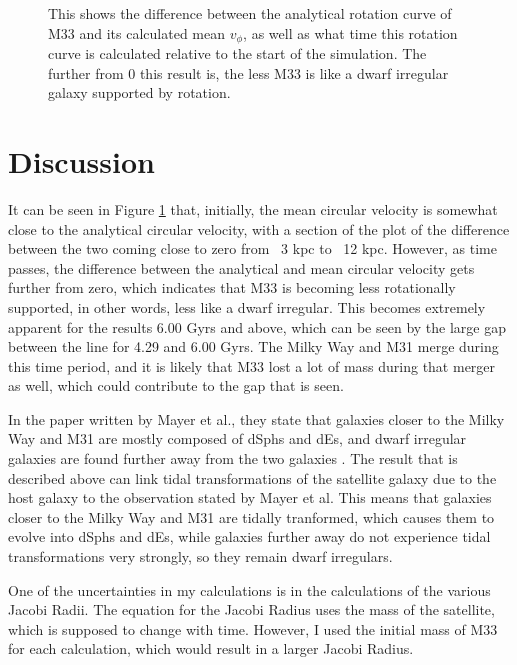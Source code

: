 \documentclass[trackchanges, twocolumn]{aastex7}
\begin{document}
\begin{figure}[ht!]
\caption{ This shows the difference between the analytical rotation curve of M33 and its calculated mean  \(v_\phi\), as well as what time this rotation curve is calculated relative to the start of the simulation. The further from 0 this result is, the less M33 is like a dwarf irregular galaxy supported by rotation.
\label{fig:M33Vphi}}
\end{figure}


\section{Discussion}

It can be seen in Figure \ref{fig:M33Vphi} that, initially, the mean circular velocity is somewhat close to the analytical circular velocity, with a section of the plot of the difference between the two coming close to zero from ~3 kpc to ~12 kpc. However, as time passes, the difference between the analytical and mean circular velocity gets further from zero, which indicates that M33 is becoming less rotationally supported, in other words, less like a dwarf irregular. This becomes extremely apparent for the results 6.00 Gyrs and above, which can be seen by the large gap between the line for 4.29 and 6.00 Gyrs. The Milky Way and M31 merge during this time period, and it is likely that M33 lost a lot of mass during that merger as well, which could contribute to the gap that is seen.

In the paper written by Mayer et al., they state that galaxies closer to the Milky Way and M31 are mostly composed of dSphs and dEs, and dwarf irregular galaxies are found further away from the two galaxies \citep{Mayer2001}. The result that is described above can link tidal transformations of the satellite galaxy due to the host galaxy to the observation stated by Mayer et al. This means that galaxies closer to the Milky Way and M31 are tidally tranformed, which causes them to evolve into dSphs and dEs, while galaxies further away do not experience tidal transformations very strongly, so they remain dwarf irregulars. 

One of the uncertainties in my calculations is in the calculations of the various Jacobi Radii. The equation for the Jacobi Radius uses the mass of the satellite, which is supposed to change with time. However, I used the initial mass of M33 for each calculation, which would result in a larger Jacobi Radius.
\end{document}
